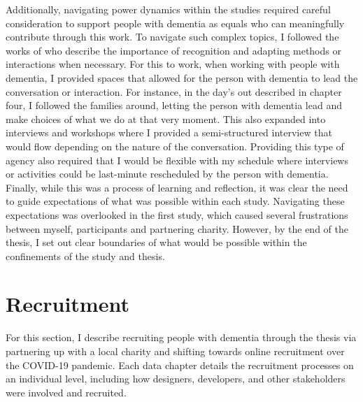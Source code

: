Additionally, navigating power dynamics within the studies required careful consideration to support people with dementia as equals who can meaningfully contribute through this work. To navigate such complex topics, I followed the works of \cite{foley_struggle_2019,morrissey_value_2017, lazar_critical_2017} who describe the importance of recognition and adapting methods or interactions when necessary. For this to work, when working with people with dementia, I provided spaces that allowed for the person with dementia to lead the conversation or interaction. For instance, in the day's out described in chapter four, I followed the families around, letting the person with dementia lead and make choices of what we do at that very moment. This also expanded into interviews and workshops where I provided a semi-structured interview that would flow depending on the nature of the conversation. Providing this type of agency also required that I would be flexible with my schedule where interviews or activities could be last-minute rescheduled by the person with dementia. Finally, while this was a process of learning and reflection, it was clear the need to guide expectations of what was possible within each study. Navigating these expectations was overlooked in the first study, which caused several frustrations between myself, participants and partnering charity. However, by the end of the thesis, I set out clear boundaries of what would be possible within the confinements of the study and thesis.

\section{Recruitment}
\label{Method:Recruitment}
For this section, I describe recruiting people with dementia through the thesis via partnering up with a local charity and shifting towards online recruitment over the COVID-19 pandemic. Each data chapter details the recruitment processes on an individual level, including how designers, developers, and other stakeholders were involved and recruited.

